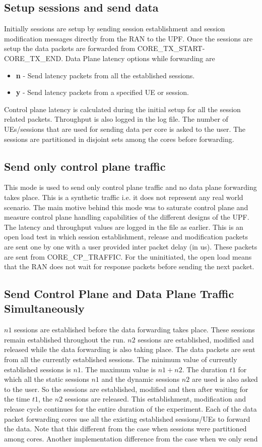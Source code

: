 \documentclass{article}
\begin{document}
\subsection{Setup sessions and send data}
Initially sessions are setup by sending session establishment and session modification messages directly from the RAN to the UPF. 
Once the sessions are setup the data packets are forwarded from CORE\_TX\_START- CORE\_TX\_END. Data Plane latency options while 
forwarding are
\begin{itemize}
    \item\textbf{n} - Send latency packets from all the established sessions. 
    \item\textbf{y} - Send latency packets from a specified UE or session.
\end{itemize}
Control plane latency is calculated during the initial setup for all the session related packets. Throughput is also logged in the log file.
The number of UEs/sessions that are used for sending data per core is asked to the user. The sessions are partitioned in disjoint sets among the cores before forwarding.   

\subsection{Send only control plane traffic}
This mode is used to send only control plane traffic and no data plane forwarding takes place.
This is a synthetic traffic i.e. it does not represent any real world scenario. The main motive behind this mode was to saturate control plane and measure control plane handling capabilities of the different designs of the UPF. The latency and throughput values are logged in the file as earlier. 
This is an open load test in which session establishment, release and modification packets are sent one by one with a user provided inter packet delay (in us). These packets are sent from CORE\_CP\_TRAFFIC. For the uninitiated, the open load means that the RAN does not wait for response packets before sending the next packet.
\subsection{Send Control Plane and Data Plane Traffic Simultaneously}
$n1$ sessions are established before the data forwarding takes place. These sessions remain established throughout the run.
$n2$ sessions are established, modified and released while the data forwarding is also taking place. The data packets are sent from all the currently established sessions. The minimum value of currently established sessions is $n1$. The maximum value is $n1+n2$.
The duration $t1$ for which all the static sessions $n1$ and the dynamic sessions $n2$ are used is also asked to the user. So the sessions are established, modified and then after waiting for the time $t1$, the $n2$ sessions are released. This establishment, modification and release cycle continues for the entire duration of the experiment.
Each of the data packet forwarding cores use all the existing established sessions/UEs to forward the data. Note that this different from the case when sessions were partitioned among cores.
Another implementation difference from the case when we only send 
\end{document}
